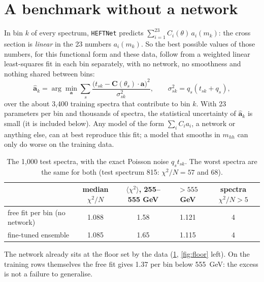 \tableofcontents

\section{A benchmark without a network}
\label{sec:free}

In bin $k$ of every spectrum, \texttt{HEFTNet} predicts $\sum_{i=1}^{23} C_i(\theta)\,a_i(m_k)$:
the cross section is \emph{linear} in the 23 numbers $a_i(m_k)$. So the best possible values
of those numbers, for this functional form and these data, follow from a weighted linear
least-squares fit in each bin separately, with no network, no smoothness and nothing shared
between bins:
\begin{equation}
  \hat{\boldsymbol a}_k = \arg\min_{\boldsymbol a} \sum_{s} \frac{\big(t_{sk} -
  \boldsymbol C(\theta_s)\cdot\boldsymbol a\big)^2}{\sigma_{sk}^2} , \qquad
  \sigma_{sk}^2 = q_s(t_{sk} + q_s),
\end{equation}
over the about 3,400 training spectra that contribute to bin $k$. With 23 parameters per
bin and thousands of spectra, the statistical uncertainty of $\hat{\boldsymbol a}_k$ is
small (it is included below). Any model of the form $\sum_i C_i a_i$, a network or anything
else, can at best reproduce this fit; a model that smooths in $m_{hh}$ can only do worse on
the training data.

\begin{table}[h]
\centering
\small
\begin{tabular}{lcccc}
\toprule
 & median $\chi^2/N$ & $\langle\chi^2\rangle$, 255--555 GeV & $>555$ GeV & spectra $\chi^2/N>5$\\
\midrule
free fit per bin (no network) & 1.088 & 1.58 & 1.121 & 4 \\
fine-tuned ensemble           & 1.085 & 1.65 & 1.115 & 4 \\
\bottomrule
\end{tabular}
\caption{The 1,000 test spectra, with the exact Poisson noise $q_s t_{sk}$. The worst
spectra are the same for both (test spectrum 815: $\chi^2/N = 57$ and 68).}
\label{tab:free}
\end{table}

The network already sits at the floor set by the data (\cref{tab:free},
\cref{fig:floor} left). On the training rows themselves the free fit gives 1.37 per bin below
555~GeV: the excess is not a failure to generalise.

